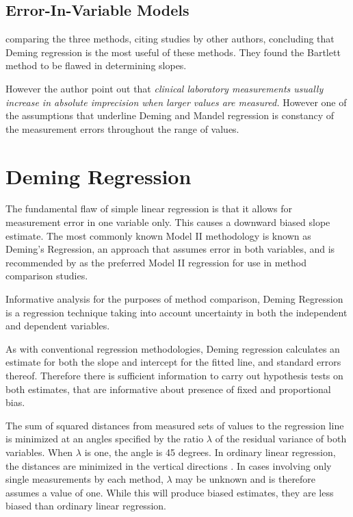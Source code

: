 \documentclass[12pt, a4paper]{report}
\theoremstyle{plain}
\theoremstyle{definition}
\theoremstyle{remark}
\begin{document}
	
	
	
	\subsection{Error-In-Variable Models}
	
	

	
	\citet{CornCoch} comparing the three methods, citing studies by other authors, concluding that Deming regression is the most useful of these methods. They found the Bartlett method to be
	flawed in determining slopes.
	
	However the author point out that \emph{ clinical laboratory measurements usually increase in absolute imprecision when larger values are measured.} However one of the assumptions that underline Deming and Mandel regression is constancy of the measurement errors throughout the range of values.
	
	
\section{Deming Regression}
The fundamental flaw of simple linear regression is that it allows for measurement error in one variable only. This causes a downward biased slope estimate. The most commonly known Model II methodology is known as Deming's Regression, an approach that assumes error in both variables, and is recommended by \citet*{CornCoch} as the preferred Model II regression for use in method comparison studies. 
		
Informative analysis for the purposes of method comparison, Deming Regression is a regression technique taking into account uncertainty in both the independent and dependent variables.
	

As with conventional regression methodologies, Deming regression
calculates an estimate for both the slope and intercept for the
fitted line, and standard errors thereof. Therefore there is
sufficient information to carry out hypothesis tests on both
estimates, that are informative about presence of fixed and
proportional bias.	
	
The sum of squared distances from measured sets of values to the regression line is minimized at an angles specified by the ratio $\lambda$ of the residual variance of both variables. When $\lambda$ is one, the angle is 45 degrees. In ordinary linear regression, the distances are minimized in the vertical directions \citep{linnet99}.
	In cases involving only single measurements by each method, $\lambda$ may be unknown and is therefore assumes a value of one. While this will produce biased estimates, they are less biased than ordinary linear regression.
	
\end{document}
